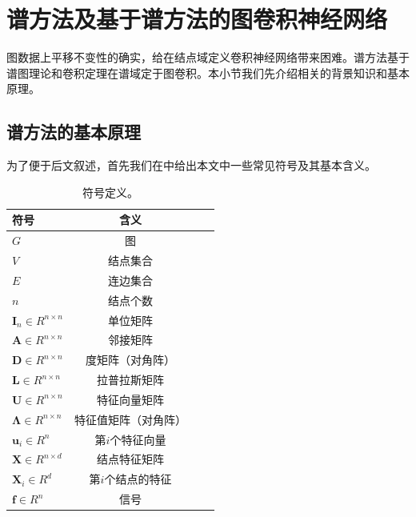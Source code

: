 \documentclass[final]{cvpr}
\begin{document}
\section{谱方法及基于谱方法的图卷积神经网络}
\label{sec:SpectralMethod}
图数据上平移不变性的确实，给在结点域定义卷积神经网络带来困难。谱方法基于谱图理论和卷积定理在谱域定于图卷积。本小节我们先介绍相关的背景知识和基本原理。

\subsection{谱方法的基本原理}

为了便于后文叙述，首先我们在中给出本文中一些常见符号及其基本含义。

\begin{table}[htb!]
    \centering
    \begin{tabular}{lccc} 
    \toprule
      符号  &  含义       \\ 
    \midrule
      $G$       &  图           \\
      $V$       &  结点集合     \\
      $E$       &  连边集合     \\
      $n$       &  结点个数     \\
      $\boldsymbol{I}_n \in R^{n \times n}$       &  单位矩阵     \\
      $\boldsymbol{A} \in R^{n \times n}$         &  邻接矩阵     \\
      $\boldsymbol{D} \in R^{n \times n}$         &  度矩阵（对角阵）     \\
      $\boldsymbol{L} \in R^{n \times n}$         &  拉普拉斯矩阵     \\
      $\boldsymbol{U} \in R^{n \times n}$         &  特征向量矩阵     \\
      $\boldsymbol{\Lambda} \in R^{n \times n}$   &  特征值矩阵（对角阵） \\
      $\boldsymbol{u}_i \in R^n$                  &  第$i$个特征向量     \\
      $\boldsymbol{X} \in R^{n \times d}$         &  结点特征矩阵     \\
      $\boldsymbol{X}_i \in R^d$                  &  第$i$个结点的特征     \\
      $\boldsymbol{f} \in R^n$                    &  信号     \\
    \bottomrule
    \end{tabular}
    \caption{符号定义。} \label{tab:notation}
\end{table}
\end{document}
